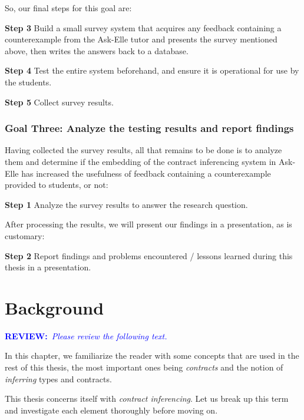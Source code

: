 \documentclass[10pt]{report}
\newcommand{\annotate}[3]{
	\begin{scriptsize}
	\textcolor{#1}{\textbf{#2}~\textit{#3}}
	\end{scriptsize}\newline}
\newcommand{\review}{\annotate{blue} {REVIEW:} {Please review the following text. \newline}}
\begin{document}
So, our final steps for this goal are:

\begin{description}
	\item{\textbf{Step 3}} Build a small survey system that acquires any feedback containing a counterexample from the Ask-Elle tutor and presents the survey mentioned above, then writes the answers back to a database.
	\item{\textbf{Step 4}} Test the entire system beforehand, and ensure it is operational for use by the students.
	\item{\textbf{Step 5}} Collect survey results.
\end{description}

\subsection{Goal Three: Analyze the testing results and report findings}

Having collected the survey results, all that remains to be done is to analyze them and determine if the embedding of the contract inferencing system in Ask-Elle has increased the usefulness of feedback containing a counterexample provided to students, or not:

\begin{description}
	\item{\textbf{Step 1}} Analyze the survey results to answer the research question.
\end{description}

After processing the results, we will present our findings in a presentation, as is customary:

\begin{description}
	\item{\textbf{Step 2}} Report findings and problems encountered / lessons learned during this thesis in a presentation.
\end{description}

\chapter{Background}

\review

In this chapter, we familiarize the reader with some concepts that are used in the rest of this thesis, the most important ones being \textit{contracts} and the notion of \textit{inferring} types and contracts.

This thesis concerns itself with \textit{contract inferencing}.
Let us break up this term and investigate each element thoroughly before moving on.
\end{document}
